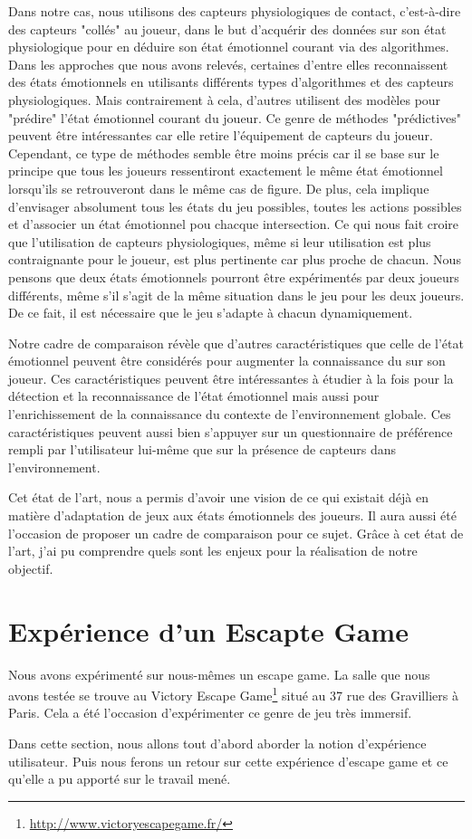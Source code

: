 \documentclass{article}
\begin{document}
	Dans notre cas, nous utilisons des capteurs physiologiques de contact, c'est-à-dire des capteurs "collés" au joueur, dans le but d'acquérir des données sur son état physiologique pour en déduire son état émotionnel courant via des algorithmes.
	Dans les approches que nous avons relevés, certaines d'entre elles reconnaissent des états émotionnels en utilisants différents types d'algorithmes et des capteurs physiologiques. 
	Mais contrairement à cela, d'autres utilisent des modèles pour "prédire" l'état émotionnel courant du joueur.
	Ce genre de méthodes "prédictives" peuvent être intéressantes car elle retire l'équipement de capteurs du joueur.
	Cependant, ce type de méthodes semble être moins précis car il se base sur le principe que tous les joueurs ressentiront exactement le même état émotionnel lorsqu'ils se retrouveront dans le même cas de figure.
	De plus, cela implique d'envisager absolument tous les états du jeu possibles, toutes les actions possibles et d'associer un état émotionnel pou chacque intersection.
	Ce qui nous fait croire que l'utilisation de capteurs physiologiques, même si leur utilisation est plus contraignante pour le joueur, est plus pertinente car plus proche de chacun.
	Nous pensons que deux états émotionnels pourront être expérimentés par deux joueurs différents, même s'il s'agit de la même situation dans le jeu pour les deux joueurs.
	De ce fait, il est nécessaire que le jeu s'adapte à chacun dynamiquement.\par
	Notre cadre de comparaison révèle que d'autres caractéristiques que celle de l'état émotionnel peuvent être considérés pour augmenter la connaissance du sur son joueur.
	Ces caractéristiques peuvent être intéressantes à étudier à la fois pour la détection et la reconnaissance de l'état émotionnel mais aussi pour l'enrichissement de la connaissance du contexte de l'environnement globale. 
	Ces caractéristiques peuvent aussi bien s'appuyer sur un questionnaire de préférence rempli par l'utilisateur lui-même que sur la présence de capteurs dans l'environnement.\par
	Cet état de l'art, nous a permis d'avoir une vision de ce qui existait déjà en matière d'adaptation de jeux aux états émotionnels des joueurs.
	Il aura aussi été l'occasion de proposer un cadre de comparaison pour ce sujet.
	Grâce à cet état de l'art, j'ai pu comprendre quels sont les enjeux pour la réalisation de notre objectif.

\section{Expérience d'un Escapte Game}\label{sec:escape}
	Nous avons expérimenté sur nous-mêmes un escape game.
	La salle que nous avons testée se trouve au Victory Escape Game\footnote{\href{http://www.victoryescapegame.fr/}{http://www.victoryescapegame.fr/}} situé au 37 rue des Gravilliers à Paris.
	Cela a été l'occasion d'expérimenter ce genre de jeu très immersif.\par
	Dans cette section, nous allons tout d'abord aborder la notion d'expérience utilisateur.
	Puis nous ferons un retour sur cette expérience d'escape game et ce qu'elle a pu apporté sur le travail mené.
\end{document}
